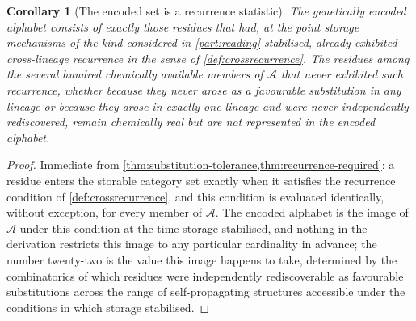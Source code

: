 \documentclass[11pt,twocolumn,a4paper]{article}
\theoremstyle{plain}
\newtheorem{corollary}[theorem]{Corollary}
\theoremstyle{definition}
\theoremstyle{remark}
\newcommand{\Resset}{\mathcal{A}}
\begin{document}
\begin{corollary}[The encoded set is a recurrence statistic]
\label{cor:encoded-count}
The genetically encoded alphabet consists of exactly those residues that
had, at the point storage mechanisms of the kind considered in
\cref{part:reading} stabilised, already exhibited cross-lineage recurrence
in the sense of \cref{def:crossrecurrence}. The residues among the several
hundred chemically available members of $\Resset$ that never exhibited such
recurrence, whether because they never arose as a favourable substitution in
any lineage or because they arose in exactly one lineage and were never
independently rediscovered, remain chemically real but are not represented
in the encoded alphabet.
\end{corollary}

\begin{proof}
Immediate from \cref{thm:substitution-tolerance,thm:recurrence-required}: a
residue enters the storable category set exactly when it satisfies the
recurrence condition of \cref{def:crossrecurrence}, and this condition is
evaluated identically, without exception, for every member of $\Resset$.
The encoded alphabet is the image of $\Resset$ under this condition at the
time storage stabilised, and nothing in the derivation restricts this image
to any particular cardinality in advance; the number twenty-two is the
value this image happens to take, determined by the combinatorics of which
residues were independently rediscoverable as favourable substitutions
across the range of self-propagating structures accessible under the
conditions in which storage stabilised.
\end{proof}
\end{document}
